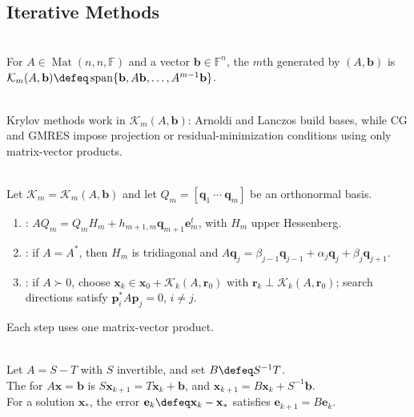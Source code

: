 \subsection{Iterative Methods}

\begin{definition} \label{def:krylov-subspace} \\
For $A\in\operatorname{Mat}(n,n,\mathbb{F})$ and a vector $\mathbf{b}\in\mathbb{F}^n$, the $m$th  generated by $(A,\mathbf{b})$ is\\
$\mathcal{K}_m(A,\mathbf{b})\defeq\operatorname{span}\{\mathbf{b},A\mathbf{b},\ldots,A^{m-1}\mathbf{b}\}$.
\end{definition}

\begin{perspective} \label{per:krylov-methods-preview} \\
Krylov methods work in $\mathcal{K}_m(A,\mathbf{b})$: Arnoldi and Lanczos build bases, while CG and GMRES impose projection or residual-minimization conditions using only matrix-vector products.
\end{perspective}

\begin{method} \label{meth:arnoldi-lanczos-cg-preview} \\
Let $\mathcal{K}_m=\mathcal{K}_m(A,\mathbf{b})$ and let $Q_m=[\mathbf{q}_1\ \cdots\ \mathbf{q}_m]$ be an orthonormal basis.
\begin{enumerate}[label=(\roman*)]
\setlength{\itemsep}{0pt}
\item {}: $AQ_m=Q_mH_m+h_{m+1,m}\mathbf{q}_{m+1}\mathbf{e}_m^t$, with $H_m$ upper Hessenberg.
\item {}: if $A=A^*$, then $H_m$ is tridiagonal and $A\mathbf{q}_j=\beta_{j-1}\mathbf{q}_{j-1}+\alpha_j\mathbf{q}_j+\beta_j\mathbf{q}_{j+1}$.
\item {}: if $A\succ0$, choose $\mathbf{x}_k\in\mathbf{x}_0+\mathcal{K}_k(A,\mathbf{r}_0)$ with $\mathbf{r}_k\perp\mathcal{K}_k(A,\mathbf{r}_0)$; search directions satisfy $\mathbf{p}_i^*A\mathbf{p}_j=0$, $i\neq j$.
\end{enumerate}
Each step uses one matrix-vector product.
\end{method}

\begin{definition} \label{def:matrix-splitting-iteration} \\
Let $A=S-T$ with $S$ invertible, and set $B\defeq S^{-1}T$.\\
The  for $A\mathbf{x}=\mathbf{b}$ is $S\mathbf{x}_{k+1}=T\mathbf{x}_k+\mathbf{b}$, and $\mathbf{x}_{k+1}=B\mathbf{x}_k+S^{-1}\mathbf{b}$.\\
For a solution $\mathbf{x}_*$, the error $\mathbf{e}_k\defeq\mathbf{x}_k-\mathbf{x}_*$ satisfies $\mathbf{e}_{k+1}=B\mathbf{e}_k$.
\end{definition}

